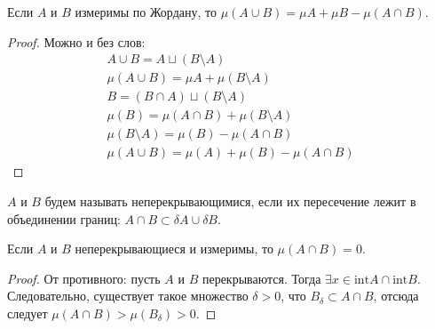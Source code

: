 \begin{Consequence}
    Если $A$ и $B$ измеримы по Жордану, то $\mu (A \cup B) = \mu A + \mu B - \mu(A \cap B)$.
\end{Consequence}
\begin{proof}
Можно и без слов:
\begin{gather}    
    A \cup B = A \sqcup (B\setminus A)\\
    \mu (A \cup B) = \mu A + \mu(B \setminus A)\\
    B = (B \cap A) \sqcup (B \setminus A)\\
    \mu(B) = \mu(A \cap B) + \mu(B \setminus A)\\
    \mu(B \setminus A) = \mu(B) - \mu(A \cap B)\\
    \mu(A \cup B) = \mu(A) + \mu(B) - \mu(A \cap B)
\end{gather}
\end{proof}
\begin{Def}
    $A$ и $B$ будем называть неперекрывающимися, если их пересечение лежит в объединении границ: $A\cap B \subset \delta A \cup \delta B$.
\end{Def}
\begin{Comment}
    Если $A$ и $B$ неперекрывающиеся и измеримы, то $\mu(A \cap B) = 0$.
\end{Comment}
\begin{proof}
    От противного: пусть $A$ и $B$ перекрываются. Тогда $\exists x \in \mathrm{int} A \cap \mathrm{int}B$. Следовательно, существует такое множество $\delta > 0$, что $B_\delta \subset A \cap B$, отсюда следует $\mu(A \cap B) > \mu(B_\delta) > 0$. 
\end{proof}